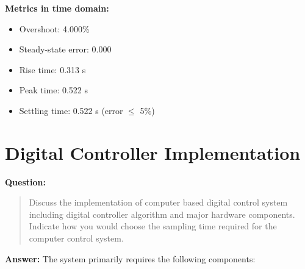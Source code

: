 \documentclass[12pt, oneside]{article}
\begin{document}
\textbf{Metrics in time domain:}
\begin{itemize}
            \item Overshoot: 4.000\%
            \item Steady-state error: 0.000
            \item Rise time: 0.313 s
            \item Peak time: 0.522 s
            \item Settling time: 0.522 s (error $\leq$ 5\%)
        \end{itemize}
\section{Digital Controller Implementation}
\textbf{Question:}
\begin{quote}
    Discuss the implementation of computer based digital control system including digital controller algorithm and major hardware components. Indicate how you would choose the sampling time required for the computer control system.
\end{quote}
\textbf{Answer:}
The system primarily requires the following components:
\end{document}
